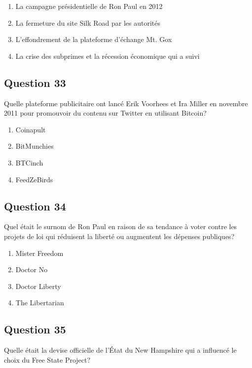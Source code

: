 \documentclass[12pt,a4paper]{article}
\begin{document}
\begin{enumerate}[label=\Alph*., leftmargin=*]
\item La campagne présidentielle de Ron Paul en 2012
\item La fermeture du site Silk Road par les autorités
\item L'effondrement de la plateforme d'échange Mt. Gox
\item La crise des subprimes et la récession économique qui a suivi
\end{enumerate}

\bigskip


\subsection*{Question 33}
Quelle plateforme publicitaire ont lancé Erik Voorhees et Ira Miller en novembre 2011 pour promouvoir du contenu sur Twitter en utilisant Bitcoin?

\begin{enumerate}[label=\Alph*., leftmargin=*]
\item Coinapult
\item BitMunchies
\item BTCinch
\item FeedZeBirds
\end{enumerate}

\bigskip


\subsection*{Question 34}
Quel était le surnom de Ron Paul en raison de sa tendance à voter contre les projets de loi qui réduisent la liberté ou augmentent les dépenses publiques?

\begin{enumerate}[label=\Alph*., leftmargin=*]
\item Mister Freedom
\item Doctor No
\item Doctor Liberty
\item The Libertarian
\end{enumerate}

\bigskip


\subsection*{Question 35}
Quelle était la devise officielle de l'État du New Hampshire qui a influencé le choix du Free State Project?
\end{document}
